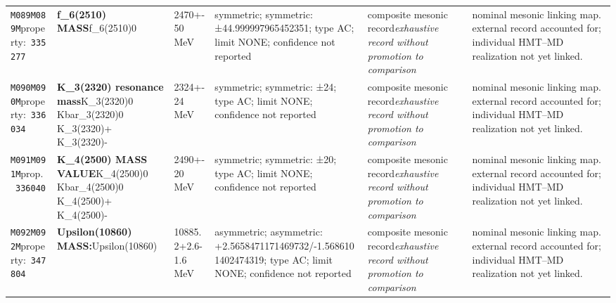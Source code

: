\begin{landscape}
\begin{longtable}{L{1.85cm}L{4.45cm}L{2.35cm}L{4.05cm}L{3.35cm}L{7.15cm}}
\texttt{M089}\newline \texttt{M089M}\newline property:\ \texttt{335277} & \textbf{f\_\allowbreak{}6(2510) MASS}\newline f\_\allowbreak{}6(2510)0 & 2470+-50\,MeV & symmetric; symmetric: ±44.999997965452351; type AC; limit NONE; confidence not reported & composite mesonic record\newline \emph{exhaustive record without promotion to comparison} & nominal mesonic linking map. external record accounted for; individual HMT--MD realization not yet linked. \\
\texttt{M090}\newline \texttt{M090M}\newline property:\ \texttt{336034} & \textbf{K\_\allowbreak{}3(2320) resonance mass}\newline K\_\allowbreak{}3(2320)0 \textbar{}\allowbreak{} Kbar\_\allowbreak{}3(2320)0 \textbar{}\allowbreak{} K\_\allowbreak{}3(2320)+ \textbar{}\allowbreak{} K\_\allowbreak{}3(2320)- & 2324+-24\,MeV & symmetric; symmetric: ±24; type AC; limit NONE; confidence not reported & composite mesonic record\newline \emph{exhaustive record without promotion to comparison} & nominal mesonic linking map. external record accounted for; individual HMT--MD realization not yet linked. \\
\texttt{M091}\newline \texttt{M091M}\newline prop.\ \texttt{336040} & \textbf{K\_\allowbreak{}4(2500) MASS VALUE}\newline K\_\allowbreak{}4(2500)0 \textbar{}\allowbreak{} Kbar\_\allowbreak{}4(2500)0 \textbar{}\allowbreak{} K\_\allowbreak{}4(2500)+ \textbar{}\allowbreak{} K\_\allowbreak{}4(2500)- & 2490+-20\,MeV & symmetric; symmetric: ±20; type AC; limit NONE; confidence not reported & composite mesonic record\newline \emph{exhaustive record without promotion to comparison} & nominal mesonic linking map. external record accounted for; individual HMT--MD realization not yet linked. \\
\texttt{M092}\newline \texttt{M092M}\newline property:\ \texttt{347804} & \textbf{Upsilon(10860) MASS:}\newline Upsilon(10860) & 10885.2+2.6-1.6\,MeV & asymmetric; asymmetric: +2.5658471171469732/-1.5686101402474319; type AC; limit NONE; confidence not reported & composite mesonic record\newline \emph{exhaustive record without promotion to comparison} & nominal mesonic linking map. external record accounted for; individual HMT--MD realization not yet linked. \\

\end{longtable}
\end{landscape}
